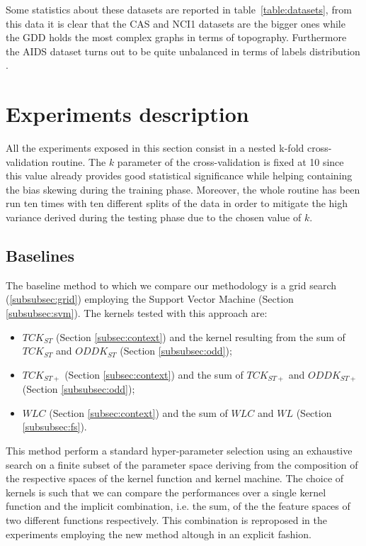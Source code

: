 Some statistics about these datasets are reported in table~\ref{table:datasets},
from this data it is clear that the CAS and NCI1 datasets are the bigger ones
while the GDD holds the most complex graphs in terms of topography.
Furthermore the AIDS dataset turns out to be quite unbalanced in terms of labels
distribution \cite{rtesselli}.  


\section{Experiments description}
\label{sec:description}

All the experiments exposed in this section consist in a nested k-fold
cross-validation routine.
The $k$ parameter of the cross-validation is fixed at 10 since this value
already provides good statistical significance while helping containing the bias
skewing during the training phase.
Moreover, the whole routine has been run ten times with ten different splits of the
data in order to mitigate the high variance derived during the testing phase due to the
chosen value of $k$.

\subsection{Baselines}
The baseline method to which we compare our methodology is a grid search (\ref{subsubsec:grid})
employing the Support Vector Machine (Section \ref{subsubsec:svm}).
The kernels tested with this approach are:
\begin{itemize}
    \item $TCK_{ST}$ (Section \ref{subsec:context}) and the kernel resulting
        from the sum of $TCK_{ST}$ and $ODDK_{ST}$ (Section \ref{subsubsec:odd});
    \item $TCK_{ST+}$ (Section \ref{subsec:context}) and the sum of $TCK_{ST+}$
        and $ODDK_{ST+}$ (Section \ref{subsubsec:odd});
    \item $WLC$ (Section \ref{subsec:context}) and the sum of $WLC$ and $WL$
        (Section \ref{subsubsec:fs}).
\end{itemize}

This method perform a standard hyper-parameter selection using an exhaustive search
on a finite subset of the parameter space deriving from the composition of the
respective spaces of the kernel function and kernel machine.
The choice of kernels is such that we can compare the performances over a single
kernel function and the implicit combination, i.e. the sum, of the the feature
spaces of two different functions respectively.
This combination is reproposed in the experiments employing the new method altough
in an explicit fashion.

